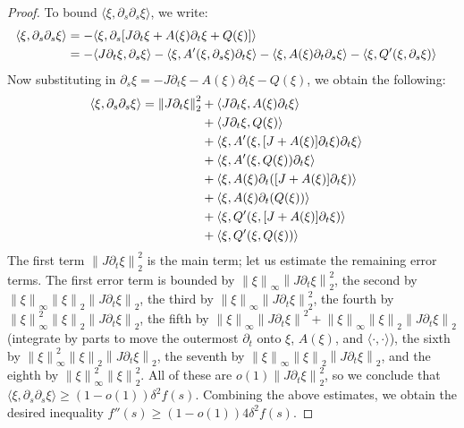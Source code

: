 \documentclass[12pt]{article}
\theoremstyle{definition}
\theoremstyle{remark}
\numberwithin{equation}{subsection}
\begin{document}
\begin{proof}
To bound $\langle\xi,\partial_s\partial_s\xi\rangle$, we write:
\begin{align}
\langle\xi,\partial_s\partial_s\xi\rangle&=-\langle\xi,\partial_s[J\partial_t\xi+A(\xi)\partial_t\xi+Q(\xi)]\rangle\cr
&=-\langle J\partial_t\xi,\partial_s\xi\rangle-\langle\xi,A'(\xi,\partial_s\xi)\partial_t\xi\rangle-\langle\xi,A(\xi)\partial_t\partial_s\xi\rangle-\langle\xi,Q'(\xi,\partial_s\xi)\rangle
\end{align}
Now substituting in $\partial_s\xi=-J\partial_t\xi-A(\xi)\partial_t\xi-Q(\xi)$, we obtain the following:
\begin{align}
\langle\xi,\partial_s\partial_s\xi\rangle=\left\|J\partial_t\xi\right\|_2^2
&+\langle J\partial_t\xi,A(\xi)\partial_t\xi\rangle\cr
&+\langle J\partial_t\xi,Q(\xi)\rangle\cr
&+\langle\xi,A'(\xi,[J+A(\xi)]\partial_t\xi)\partial_t\xi\rangle\cr
&+\langle\xi,A'(\xi,Q(\xi))\partial_t\xi\rangle\cr
&+\langle\xi,A(\xi)\partial_t([J+A(\xi)]\partial_t\xi)\rangle\cr
&+\langle\xi,A(\xi)\partial_t(Q(\xi))\rangle\cr
&+\langle\xi,Q'(\xi,[J+A(\xi)]\partial_t\xi)\rangle\cr
&+\langle\xi,Q'(\xi,Q(\xi))\rangle
\end{align}
The first term $\left\|J\partial_t\xi\right\|_2^2$ is the main term; let us estimate the remaining error terms.  The first error term is bounded by $\left\|\xi\right\|_\infty\left\|J\partial_t\xi\right\|_2^2$, the second by $\left\|\xi\right\|_\infty\left\|\xi\right\|_2\left\|J\partial_t\xi\right\|_2$, the third by $\left\|\xi\right\|_\infty\left\|J\partial_t\xi\right\|_2^2$, the fourth by $\left\|\xi\right\|_\infty^2\left\|\xi\right\|_2\left\|J\partial_t\xi\right\|_2$, the fifth by $\left\|\xi\right\|_\infty\left\|J\partial_t\xi\right\|^2+\left\|\xi\right\|_\infty\left\|\xi\right\|_2\left\|J\partial_t\xi\right\|_2$ (integrate by parts to move the outermost $\partial_t$ onto $\xi$, $A(\xi)$, and $\langle\cdot,\cdot\rangle$), the sixth by $\left\|\xi\right\|_\infty^2\left\|\xi\right\|_2\left\|J\partial_t\xi\right\|_2$, the seventh by $\left\|\xi\right\|_\infty\left\|\xi\right\|_2\left\|J\partial_t\xi\right\|_2$, and the eighth by $\left\|\xi\right\|_\infty^2\left\|\xi\right\|_2^2$.  All of these are $o(1)\left\|J\partial_t\xi\right\|_2^2$, so we conclude that $\langle\xi,\partial_s\partial_s\xi\rangle\geq(1-o(1))\delta^2f(s)$.  Combining the above estimates, we obtain the desired inequality $f''(s)\geq(1-o(1))4\delta^2f(s)$.


\end{proof}
\end{document}
